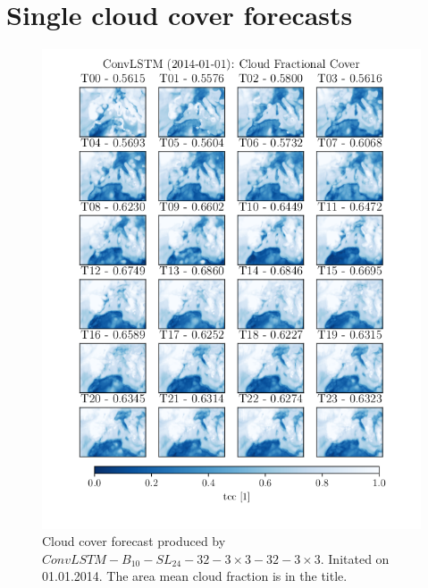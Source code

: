 \cleardoublepage
\section{Single cloud cover forecasts}
\begin{figure}
    \centering
    \includegraphics[scale =0.85]{python_figs/timelapse_convlstm_24hrs_from_2014-01-01.png}
    \caption{Cloud cover forecast produced by $ConvLSTM-B_{10}-SL_{24}-32-3\times3-32-3\times3$. Initated on 01.01.2014. The area mean  cloud fraction is in the title.}
    \label{fig:timelapse_3x3}
\end{figure}
